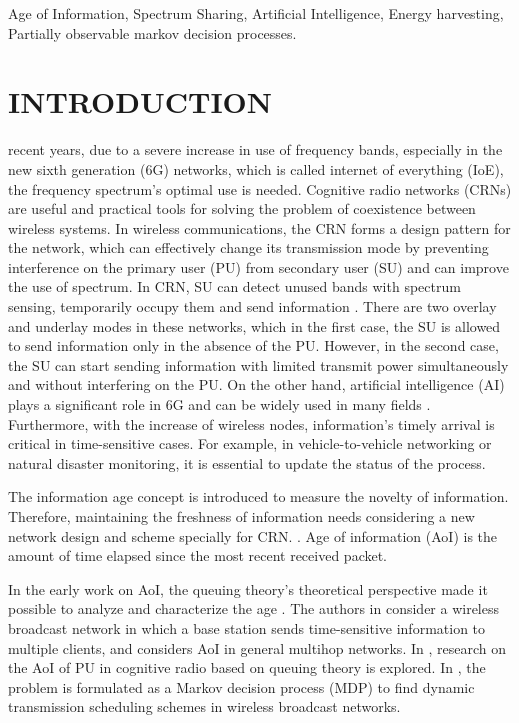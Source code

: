 \documentclass[journal]{IEEEtran}
\begin{document}
	\begin{IEEEkeywords}
		Age of Information, Spectrum Sharing, Artificial Intelligence, Energy harvesting, Partially observable markov decision processes.
	\end{IEEEkeywords}

	\section{INTRODUCTION}
		 recent years, due to a severe increase in use of frequency bands, especially in the new sixth generation (6G) networks, which is called internet of everything (IoE), the frequency spectrum's optimal use is needed. Cognitive radio networks (CRNs) are useful and practical tools for solving the problem of coexistence between wireless systems. In wireless communications, the CRN forms a design pattern for the network, which can effectively change its transmission mode by preventing interference on the primary user (PU) from secondary user (SU) and can improve the use of spectrum. In CRN, SU can detect unused bands with spectrum sensing, temporarily occupy them and send information \cite{Multiband_1,Cooperative_2}. There are two overlay and underlay modes in these networks, which in the first case, the SU is allowed to send information only in the absence of the PU. However, in the second case, the SU can start sending information with limited transmit power simultaneously and without interfering on the PU. On the other hand, artificial intelligence (AI) plays a significant role in 6G and can be widely used in many fields \cite{Spectrum_3}. Furthermore, with the increase of wireless nodes, information's timely arrival is critical in time-sensitive cases. For example, in vehicle-to-vehicle networking or natural disaster monitoring, it is essential to update the status of the process.
		
		The information age concept is introduced to measure the novelty of information. Therefore, maintaining the freshness of information needs considering a new network design and scheme specially for CRN. \cite{Minimizing_5}. Age of information (AoI) is the amount of time elapsed since the most recent received packet.
		
		In the early work on AoI, the queuing theory's theoretical perspective made it possible to analyze and characterize the age \cite{Minimizing_8,Age_9,Age_10}. The authors in \cite{Minimizing_8} consider a wireless broadcast network in which a base station sends time-sensitive information to multiple clients, and \cite{Age_9} considers AoI in general multihop networks. In \cite{Age_10}, research on the AoI of PU in cognitive radio based on queuing theory is explored. In \cite{Age_11,Scheduling_12}, the problem is formulated as a Markov decision process (MDP) to find dynamic transmission scheduling schemes in wireless broadcast networks.
		
\end{document}
